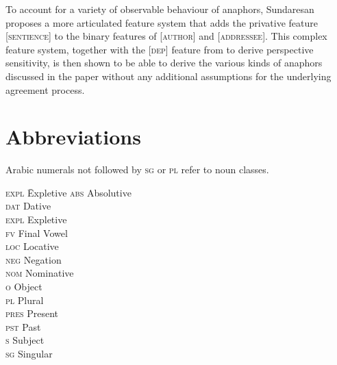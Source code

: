 \documentclass[output=paper
,modfonts
,nonflat]{langsci/langscibook}
\begin{document}
To account for a variety of observable behaviour of anaphors, Sundaresan proposes a more articulated feature system that adds the privative feature [\textsc{sentience}] to the binary features of [\textsc{author}] and [\textsc{addressee}]. This complex feature system, together with the [\textsc{dep}] feature from \citet{sundaresan2012} to derive perspective sensitivity, is then shown to be able to derive the various kinds of anaphors discussed in the paper without any additional assumptions for the underlying agreement process.

\section*{Abbreviations}

Arabic numerals not followed by \textsc{sg} or \textsc{pl} refer to noun classes.

\begin{multicols}{3}
	\begin{tabbing}
\textsc{expl}\hspace{5mm} \= Expletive\kill
		\textsc{abs} 	\> Absolutive \\
		\textsc{dat} 	\> Dative	\\
		\textsc{expl} 	\> Expletive \\
		\textsc{fv} 	\> Final Vowel	\\
		\textsc{loc} 	\> Locative \\
		\textsc{neg} 	\> Negation \\
		\textsc{nom} 	\> Nominative 	\\
		\textsc{o} \> Object 	\\
		\textsc{pl} \> Plural	\\
		\textsc{pres} \> Present	\\
		\textsc{pst} \> Past	\\
		\textsc{s} \> Subject	\\
		\textsc{sg} \> Singular\\
\end{tabbing}
\end{multicols}

{\sloppy\printbibliography[heading=subbibliography,notkeyword=this]}
\end{document}
